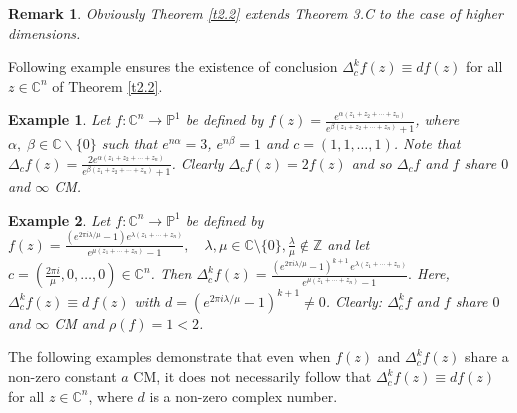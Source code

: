 \documentclass[11pt,reqno]{amsart}
\newtheorem{exm}{Example}[section]
\newtheorem{rem}{Remark}[section]
\numberwithin{equation}{section}
\begin{document}
\begin{rem} Obviously Theorem \ref{t2.2} extends Theorem 3.C to the case of higher dimensions.
\end{rem}

Following example ensures the existence of conclusion $\Delta_c^{k} f(z) \equiv df(z)$ for all $z\in \mathbb{C}^n$
of Theorem \ref{t2.2}.

\begin{exm} Let $f:\mathbb{C}^n\rightarrow \mathbb{P}^1$ be defined by $f(z)=\frac{e^{\alpha (z_1+z_2+\cdots+z_n)}}{e^{\beta (z_1+z_2+\cdots+z_n)}+1}$, where $\alpha,\;\beta\in \mathbb{C}\backslash \{0\}$ such that $e^{n\alpha}=3$, $e^{n\beta}=1$ and $c=(1,1,\ldots,1)$. Note that $\Delta_cf(z)=\frac{2e^{\alpha (z_1+z_2+\cdots+z_n)}}{e^{\beta (z_1+z_2+\cdots+z_n)}+1}$.
Clearly $\Delta_cf(z)=2f(z)$ and so $\Delta_cf$ and $f$ share $0$ and $\infty$ CM.
\end{exm} 
\begin{exm}
	Let $f:\mathbb{C}^n \to \mathbb{P}^1$ be defined by
$f(z)=\frac{(e^{2\pi i \lambda/\mu} - 1) e^{\lambda (z_1+\cdots+z_n)}}{e^{\mu (z_1+\cdots+z_n)} - 1}, \quad \lambda,\mu \in \mathbb{C}\setminus\{0\}, \frac{\lambda}{\mu}\not\in\mathbb{Z}$
	and let $c = \left(\frac{2\pi i}{\mu},0,\dots,0\right) \in \mathbb{C}^n$. Then $\Delta_c^k f(z) = \frac{(e^{2\pi i \lambda/\mu} - 1)^{k+1}\, e^{\lambda (z_1+\cdots+z_n)}}{e^{\mu (z_1+\cdots+z_n)} - 1}.$	Here, $\Delta_c^k f(z) \equiv d\, f(z)$ with $d = (e^{2\pi i \lambda/\mu} -1)^{k+1} \neq 0$.
	Clearly: $\Delta_c^k f$  and $f$ share $0$ and $\infty$ CM and $\rho(f)=1<2$.
\end{exm}

The following examples demonstrate that even when $f(z)$ and $\Delta_c^{k} f(z)$ share a non-zero constant $a$ CM, it does not necessarily follow that
$\Delta_c^{k} f(z) \equiv df(z)$ for all $z\in \mathbb{C}^n$, where $d$ is a non-zero complex number.
\end{document}
